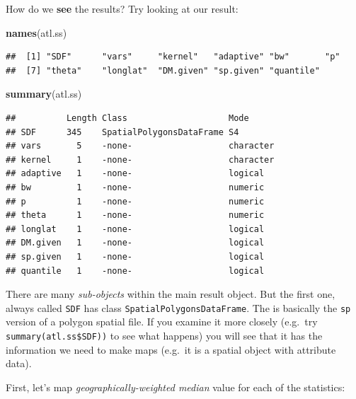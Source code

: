 \documentclass[
]{book}
\newenvironment{Shaded}{\begin{snugshade}}{\end{snugshade}}
\newcommand{\AttributeTok}[1]{\textcolor[rgb]{0.13,0.29,0.53}{#1}}
\newcommand{\CommentTok}[1]{\textcolor[rgb]{0.56,0.35,0.01}{\textit{#1}}}
\newcommand{\FunctionTok}[1]{\textcolor[rgb]{0.13,0.29,0.53}{\textbf{#1}}}
\newcommand{\NormalTok}[1]{#1}
\newcommand{\SpecialCharTok}[1]{\textcolor[rgb]{0.81,0.36,0.00}{\textbf{#1}}}
\newcommand{\StringTok}[1]{\textcolor[rgb]{0.31,0.60,0.02}{#1}}
\begin{document}
How do we \textbf{see} the results? Try looking at our result:

\begin{Shaded}
\begin{Highlighting}[]
\FunctionTok{names}\NormalTok{(atl.ss)}
\end{Highlighting}
\end{Shaded}

\begin{verbatim}
##  [1] "SDF"      "vars"     "kernel"   "adaptive" "bw"       "p"       
##  [7] "theta"    "longlat"  "DM.given" "sp.given" "quantile"
\end{verbatim}

\begin{Shaded}
\begin{Highlighting}[]
\FunctionTok{summary}\NormalTok{(atl.ss)}
\end{Highlighting}
\end{Shaded}

\begin{verbatim}
##          Length Class                    Mode     
## SDF      345    SpatialPolygonsDataFrame S4       
## vars       5    -none-                   character
## kernel     1    -none-                   character
## adaptive   1    -none-                   logical  
## bw         1    -none-                   numeric  
## p          1    -none-                   numeric  
## theta      1    -none-                   numeric  
## longlat    1    -none-                   logical  
## DM.given   1    -none-                   logical  
## sp.given   1    -none-                   logical  
## quantile   1    -none-                   logical
\end{verbatim}

There are many \emph{sub-objects} within the main result object. But the first one, always called \texttt{SDF} has class \texttt{SpatialPolygonsDataFrame}. The is basically the \texttt{sp} version of a polygon spatial file. If you examine it more closely (e.g.~try \texttt{summary(atl.ss\$SDF))} to see what happens) you will see that it has the information we need to make maps (e.g.~it is a spatial object with attribute data).

First, let's map \emph{geographically-weighted median} value for each of the statistics:

\begin{Shaded}
\end{Shaded}
\end{document}
